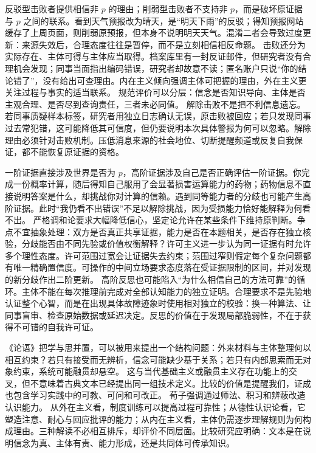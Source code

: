反驳型击败者提供相信非 \(p\) 的理由；削弱型击败者不支持非 \(p\)，而是破坏原证据与 \(p\) 之间的联系。看到天气预报改为晴天，是“明天下雨”的反驳；得知预报网站缓存了上周页面，则削弱原预报，但本身不说明明天天气。混淆二者会导致过度更新：来源失效后，合理态度往往是暂停，而不是立刻相信相反命题。 击败还分为实际存在、主体可得与主体应当取得。档案库里有一封反证邮件，但研究者没有合理机会发现；同事当面指出编码错误，研究者却故意不读；匿名账户只说“你的结论错了”，没有给出可查理由。内在主义倾向强调主体可把握的理由，外在主义更关注过程与事实的适当联系。\parencite{goldman1979,conee1985} 规范评价可以分层：信念是否知识导向、主体是否主观合理、是否尽到查询责任，三者未必同值。 解除击败不是把不利信息遗忘。若同事质疑样本标签，研究者用独立日志确认无误，原击败被回应；若只发现同事过去常犯错，这可能降低其可信度，但仍要说明本次具体警报为何可以忽略。解除理由必须针对击败机制。压低消息来源的社会地位、切断提醒频道或反复自我保证，都不能恢复原证据的资格。

一阶证据直接涉及世界是否为 \(p\)，高阶证据涉及自己是否正确评估一阶证据。你完成一份概率计算，随后得知自己服用了会显著损害运算能力的药物；药物信息不直接说明答案是什么，却挑战你对计算的信赖。遇到同等能力者的分歧也可能产生高阶证据。此时“我仍看不出错误”不足以解除挑战，因为受损能力恰好能解释为何看不出。 严格调和论要求大幅降低信心，坚定论允许在某些条件下维持原判断。争点不宜抽象处理：双方是否真正共享证据，能力是否在本题相关，是否存在独立核验，分歧能否由不同先验或价值权衡解释？许可主义进一步认为同一证据有时允许多个理性态度。许可范围过宽会让证据失去约束；范围过窄则假定每个复杂问题都有唯一精确置信度。可操作的中间立场要求态度落在受证据限制的区间，并对发现的新分歧作出二阶更新。 高阶反思也可能陷入“为什么相信自己的方法可靠”的循环。主体不能在每次推理前完成对全部认知能力的独立证明。合理要求不是先验地认证整个心智，而是在出现具体故障迹象时使用相对独立的校验：换一种算法、让同事盲审、检查原始数据或延迟决定。反思的价值在于发现局部脆弱性，不在于获得不可错的自我许可证。

《论语》把学与思并置，可以被用来提出一个结构问题：外来材料与主体整理何以相互约束？若只有接受而无辨析，信念可能缺少基于关系；若只有内部思索而无对象约束，系统可能融贯却悬空。\parencite{analects2003} 这与当代基础主义或融贯主义存在功能上的交叉，但不意味着古典文本已经提出同一组技术定义。比较的价值是提醒我们，证成也包含学习实践中的可教、可问和可改正。 荀子强调通过师法、积习和辨蔽改造认识能力。\parencite{xunzi2014} 从外在主义看，制度训练可以提高过程可靠性；从德性认识论看，它塑造注意、耐心与回应批评的能力；从内在主义看，主体仍需逐步理解规则为何构成理由。三种解读不必相互排斥，却评价不同层面。比较研究应明确：文本是在说明信念为真、主体有责、能力形成，还是共同体可传承知识。

